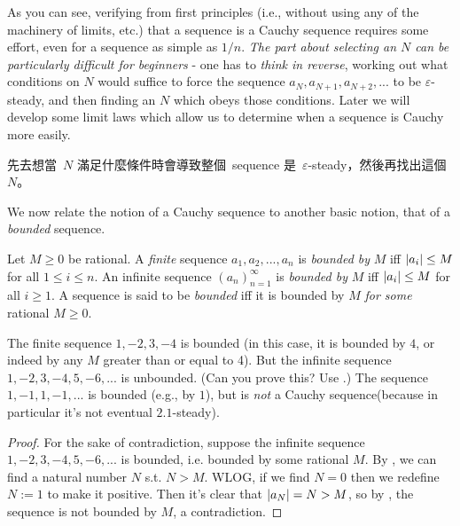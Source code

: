 \begin{note}
As you can see, verifying from first principles (i.e., without using any of the machinery of limits, etc.) that a sequence is a Cauchy sequence requires some effort, even for a sequence as simple as \(1/n\).
\emph{The part about selecting an \(N\) can be particularly difficult for beginners} - one has to \emph{think in reverse}, working out what conditions on \(N\) would suffice to force the sequence \(a_N, a_{N + 1}, a_{N + 2}, ...\) to be \(\varepsilon\)-steady, and then finding an \(N\) which obeys those conditions.
Later we will develop some limit laws which allow us to determine when a sequence is Cauchy more easily.
\end{note}

\begin{note}
先去想當\ \(N\) 滿足什麼條件時會導致整個\ sequence 是\ \(\varepsilon\)-steady，然後再找出這個\ \(N\)。
\end{note}

We now relate the notion of a Cauchy sequence to another basic notion, that of a \emph{bounded} sequence.

\begin{definition}  \label{def 5.1.12}
Let \(M \ge 0\) be rational.
A \emph{finite} sequence \(a_1, a_2, ..., a_n\) is \emph{bounded by} \(M\) iff \(\lvert a_i\rvert \le M\) for all \(1 \le i \le n\).
An infinite sequence \((a_n)_{n = 1}^{\infty}\) is \emph{bounded by} \(M\) iff \(\lvert a_i\rvert \le M\) for all \(i \ge 1\).
A sequence is said to be \emph{bounded} iff it is bounded by \(M\) \emph{for some} rational \(M \ge 0\).
\end{definition}

\begin{example} \label{example 5.1.13}
The finite sequence \(1, -2, 3, -4\) is bounded (in this case, it is bounded by \(4\), or indeed by any \(M\) greater than or equal to 4).
But the infinite sequence \(1, -2, 3, -4, 5, -6,...\) is unbounded. (Can you prove this? Use .)
The sequence \(1, -1, 1, -1,...\) is bounded (e.g., by \(1\)), but is \emph{not} a Cauchy sequence(because in particular it's not eventual \(2.1\)-steady).
\end{example}

\begin{proof}
For the sake of contradiction, suppose the infinite sequence \(1, -2, 3, -4, 5, -6,...\) is bounded, i.e. bounded by some rational \(M\).
By , we can find a natural number \(N\) s.t. \(N > M\).
WLOG, if we find \(N = 0\) then we redefine \(N := 1\) to make it positive.
Then it's clear that \(\lvert a_N\rvert = N > M\), so by , the sequence is not bounded by \(M\), a contradiction.
\end{proof}

